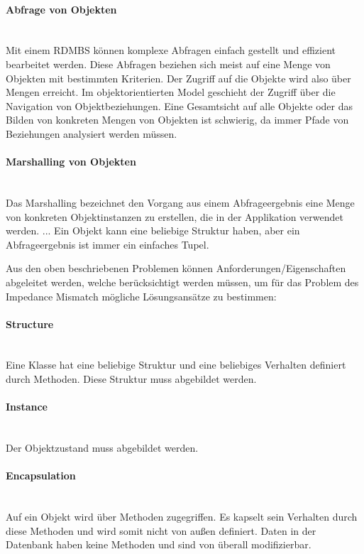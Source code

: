 \paragraph{Abfrage von Objekten} \hspace{0pt} \\
Mit einem RDMBS können komplexe Abfragen einfach gestellt und effizient bearbeitet werden. Diese Abfragen beziehen sich meist auf eine Menge von Objekten mit bestimmten Kriterien. Der Zugriff auf die Objekte wird also über Mengen erreicht. Im objektorientierten Model geschieht der Zugriff über die Navigation von Objektbeziehungen. Eine Gesamtsicht auf alle Objekte oder das Bilden von konkreten Mengen von Objekten ist schwierig, da immer Pfade von Beziehungen analysiert werden müssen.

\paragraph{Marshalling von Objekten} \hspace{0pt} \\
Das Marshalling bezeichnet den Vorgang aus einem Abfrageergebnis eine Menge von konkreten Objektinstanzen zu erstellen, die in der Applikation verwendet werden. ... Ein Objekt kann eine beliebige Struktur haben, aber ein Abfrageergebnis ist immer ein einfaches Tupel.

\hspace{1pt}

\noindent 
Aus den oben beschriebenen Problemen können Anforderungen/Eigenschaften abgeleitet werden, welche berücksichtigt werden müssen, um für das Problem des Impedance Mismatch mögliche Lösungsansätze zu bestimmen:

\paragraph{Structure} \hspace{0pt} \\
Eine Klasse hat eine beliebige Struktur und eine beliebiges Verhalten definiert durch Methoden. Diese Struktur muss abgebildet werden.

\paragraph{Instance} \hspace{0pt} \\
Der Objektzustand muss abgebildet werden.

\paragraph{Encapsulation} \hspace{0pt} \\
Auf ein Objekt wird über Methoden zugegriffen. Es kapselt sein Verhalten durch diese Methoden und wird somit nicht von außen definiert. Daten in der Datenbank haben keine Methoden und sind von überall modifizierbar. 

